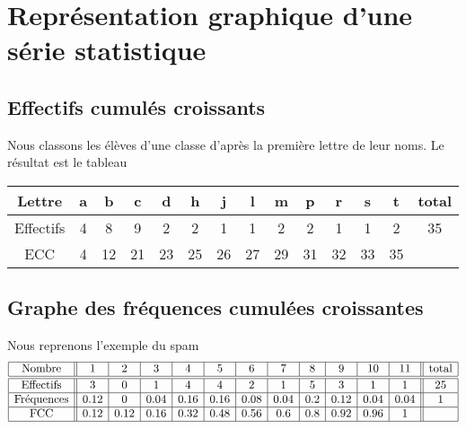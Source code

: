 \section{Représentation graphique d'une série statistique}

\subsection{Effectifs cumulés croissants}

Nous classons les élèves d'une classe d'après la première lettre de leur noms. Le résultat est le tableau
\begin{center}
\begin{tabular}[]{|c||c|c|c|c|c|c|c|c|c|c|c|c||c|}
        \hline
        Lettre&a&b&c&d&h&j&l&m&p&r&s&t&total\\
        \hline\hline
        Effectifs&4&8&9&2&2&1&1&2&2&1&1&2&35\\
        \hline
        ECC&4&12&21&23&25&26&27&29&31&32&33&35&\\
        \hline
\end{tabular}
\end{center}



\subsection{Graphe des fréquences cumulées croissantes}

Nous reprenons l'exemple du spam
\begin{equation*}
    \begin{array}[]{|c||c|c|c|c|c|c|c|c|c|c|c|| c |}
        \hline
        \text{Nombre}&1&2&3&4&5&6&7&8&9&10&11&\text{total}\\
        \hline\hline
        \text{Effectifs}&3&0&1&4&4&2&1&5&3&1&1&25\\
        \hline
        \text{Fréquences}&0.12&0&0.04&0.16&0.16&0.08&0.04&0.2&0.12&0.04&0.04&1\\
        \hline
        \text{FCC}&0.12&0.12&0.16&0.32&0.48&0.56&0.6&0.8&0.92&0.96&1&\\
        \hline
    \end{array}
\end{equation*}


